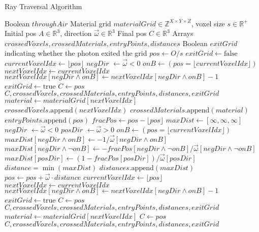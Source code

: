 \begin{algorithm}[H]
    \caption{Ray Traversal Algorithm}
    \label{alg:rayTraversal}
    \begin{algorithmic}[1]
        \Require Boolean $throughAir$
        \Require Material grid $materialGrid \in \mathbb{Z}^{X \times Y \times
        Z}$, voxel size $s \in \mathbb{R}^+$
        \Require Initial pos $A \in \mathbb{R}^3$, direction $\vec{\omega} \in
        \mathbb{R}^3$
        \Ensure Final pos $C \in \mathbb{R}^3$
        \Ensure Arrays $crossedVoxels, crossedMaterials, entryPoints, distances$
        \Ensure Boolean $exitGrid$ indicating whether the photon exited the grid
        \State $pos \gets O / s$
        \State $exitGrid \gets \text{false}$
        \State $currentVoxelIdx \gets \lfloor pos \rfloor$
        \State $negDir$ $\gets \vec{\omega} < 0$
        \State $onB \gets (pos = \lfloor currentVoxelIdx \rfloor)$
        \State $nextVoxelIdx \gets currentVoxelIdx$
        \State $nextVoxelIdx[negDir \land onB] \gets nextVoxelIdx[negDir
        \land onB] - 1$
            \State $exitGrid \gets \text{true}$
            \State $C \gets pos$
            \State \Return $C, crossedVoxels, crossedMaterials,entryPoints, 
            distances, exitGrid$
        \EndIf
        \State $material \gets materialGrid[nextVoxelIdx]$
            \State $crossedVoxels.\text{append}(nextVoxelIdx)$
            \State $crossedMaterials.\text{append}(material)$
            \State $entryPoints.\text{append}(pos)$
            \State $fracPos \gets pos - \lfloor pos \rfloor$
            \State $maxDist \gets [\infty, \infty, \infty]$
            \State $negDir$ $\gets \vec{\omega} < 0$
            \State $posDir$ $\gets \vec{\omega} > 0$
            \State $onB \gets (pos = \lfloor currentVoxelIdx \rfloor)$
            \State $maxDist[negDir \land onB] \gets -1 / \vec{\omega}[negDir
            \land onB]$
            \State $maxDist[negDir \land \neg onB] \gets 
            -fracPos[negDir \land \neg onB] / \vec{\omega}
            [negDir \land \neg onB]$
            \State $maxDist[posDir] \gets (1 - fracPos[posDir]) / \vec{\omega}
            [posDir]$
            \State $distance = \min(maxDist)$
            \State $distances.\text{append}(maxDist)$
            \State $pos \gets pos + \vec{\omega} \cdot distance$
            \State $currentVoxelIdx \gets \lfloor pos \rfloor$
            \State $nextVoxelIdx \gets currentVoxelIdx$
            \State $nextVoxelIdx[negDir \land onB] \gets nextVoxelIdx[negDir
            \land onB] - 1$
                \State $exitGrid \gets \text{true}$
                \State $C \gets pos$
                \State \Return $C, crossedVoxels, crossedMaterials, entryPoints,
                distances, exitGrid$
            \EndIf
            \State $material \gets materialGrid[nextVoxelIdx]$
        \EndWhile
        \State $C \gets pos$
        \State \Return $C, crossedVoxels, crossedMaterials, entryPoints, distances, exitGrid$


\end{algorithmic}
\end{algorithm}
